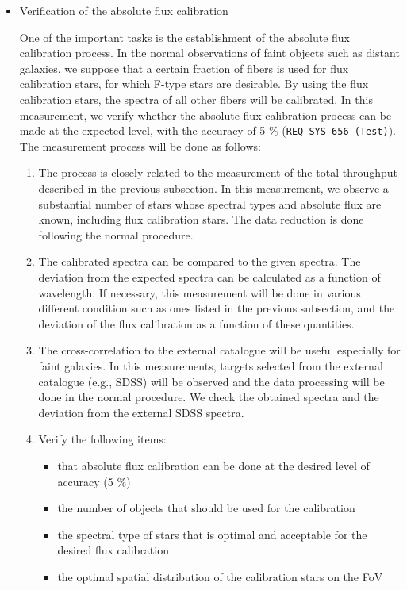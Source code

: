 \begin{itemize}
\item{Verification of the absolute flux calibration}

One of the important tasks is the establishment of the absolute flux calibration process. In the normal observations of faint objects such as distant galaxies, we suppose that a certain fraction of fibers is used for flux calibration stars, for which F-type stars are desirable. By using the flux calibration stars, the spectra of all other fibers will be calibrated. In this measurement, we verify whether the absolute flux calibration process can be made at the expected level, with the accuracy of 5 \% ({\tt REQ-SYS-656 (Test)}). The measurement process will be done as follows:

\begin{enumerate}
\item{The process is closely related to the measurement of the total throughput described in the previous subsection. In this measurement, we observe a substantial number of stars whose spectral types and absolute flux are known, including flux calibration stars. The data reduction is done following the normal procedure.}

\item{The calibrated spectra can be compared to the given spectra. The deviation from the expected spectra can be calculated as a function of wavelength. If necessary, this measurement will be done in various different condition such as ones listed in the previous subsection, and the deviation of the flux calibration as a function of these quantities.}

\item{The cross-correlation to the external catalogue will be useful especially for faint galaxies. In this measurements, targets selected from the external catalogue (e.g., SDSS) will be observed and the data processing will be done in the normal procedure. We check the obtained spectra and the deviation from the external SDSS spectra.}

\item{Verify the following items:}
\begin{itemize}
\item{that absolute flux calibration can be done at the desired level of accuracy (5 \%)}
\item{the number of objects that should be used for the calibration}
\item{the spectral type of stars that is optimal and acceptable for the desired flux calibration}
\item{the optimal spatial distribution of the calibration stars on the FoV}
\end{itemize}
\end{enumerate}


\end{itemize}
